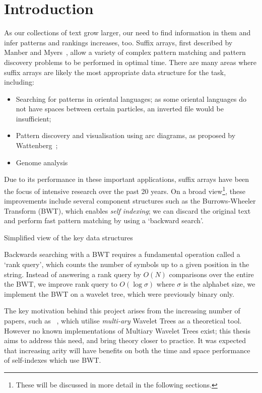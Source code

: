 \section{Introduction}

As our collections of text grow larger, our need to find information in them
and infer patterns and rankings increases, too. Suffix arrays, first
described by Manber and Myers~\cite{manber1990}, allow a variety of complex 
pattern matching and pattern discovery problems to be performed in optimal time. 
There are many areas where suffix arrays are likely the most appropriate data 
structure for the task, including:

\begin{itemize}
\item
	Searching for patterns in oriental languages; as some oriental languages
    do not have spaces between certain particles, an inverted file would be
    insufficient;
\item
	Pattern discovery and visualisation using arc diagrams, as proposed by
    Wattenberg~\cite{arc:wattenberg2002};
\item
	Genome analysis~\cite{genome:abouelhoda2004, genome:flicek2009}
\end{itemize}

Due to its performance in these important applications, suffix arrays have been
the focus of intensive research over the past 20 years. On a broad
view\footnote{These will be discussed in more detail in the following 
sections.}, these improvements include several component structures such as the 
Burrows-Wheeler Transform (BWT), which enables \emph{self indexing}; we can 
discard the original text and perform fast pattern matching by using a `backward 
search'.

			{Simplified view of the key data structures}

Backwards searching with a BWT requires a fundamental operation called a 
`rank query', which counts the number of symbols up to a given position in the 
string. Instead of answering a rank query by $O(N)$ comparisons over the
entire the BWT, we improve rank query to $O(\log \sigma)$ where $\sigma$ 
is the alphabet size, we implement the BWT on a wavelet tree, which were 
previously binary only. 

The key motivation behind this project arises from the increasing number of
papers, such as ~\cite{yu2009}, which utilise \emph{multi-ary} Wavelet
Trees as a theoretical tool. However no known implementations of Multiary 
Wavelet Trees exist; this thesis aims to address this need, and bring theory 
closer to practice. It was expected that increasing arity will have benefits
on both the time and space performance of self-indexes which use BWT.

